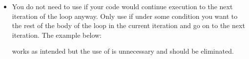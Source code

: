 \documentclass[letterpaper,10pt,english]{sphinxmanual}
\begin{document}
\begin{itemize}
\begin{itemize}
\end{itemize}

\item {} 
You do not need to use  if your code would continue
execution to the next iteration of the loop anyway. Only use
 if under some condition you want to  the
rest of the body of the loop in the current iteration and
go on to the next iteration. The example below:

\begin{sphinxVerbatim}[commandchars=\\\{\}]
  \PYG{p}{[}     \PYG{p}{]}
  
  
   
       
          
          
  
\end{sphinxVerbatim}

works as intended but the use of  is unnecessary and
should be eliminated.

\end{itemize}
\end{document}
